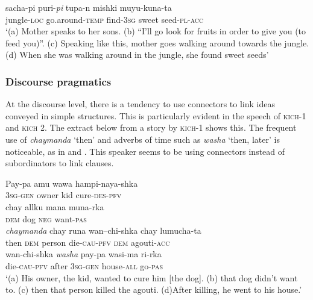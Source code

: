 \documentclass[output=paper]{langscibook}
\begin{document}
\ex\label{ex:7:10d}
\gll    sacha-pi           puri-\textit{pi} tupa-n             mishki      muyu-kuna-ta\\
jungle-\textsc{loc}  go.around-\textsc{temp}  find-\textsc{3sg}  sweet    seed-\textsc{pl}{}-\textsc{acc}\\
\glt ‘(a) Mother speaks to her sons. (b) “I’ll go look for fruits in order to give you (to feed you)”. (c) Speaking like this, mother goes walking around towards the jungle. (d) When she was walking around in the jungle, she found sweet seeds’
\z
\z

\subsubsection{Discourse pragmatics}
At the discourse level, there is a tendency to use connectors to link ideas conveyed in simple structures. This is particularly evident in the speech of {\textsc{kich}}{{}-1 and} {\textsc{kich}}{ 2. The extract below from a story by} {\textsc{kich}}{{}-1 shows this. The frequent use of} {\textit{chaymanda}}{ ‘then’ and adverbs of time such as} {\textit{washa}}{ ‘then, later’ is noticeable, as in  and . This speaker seems to be using connectors instead of subordinators to link clauses.}


\ea\label{ex:7:11}
\ea\label{ex:7:11a}
\gll   Pay-pa         amu   wawa   hampi-naya-shka\\
    \textsc{3sg-gen}  owner  kid  cure-\textsc{des-pfv}\\

\ex\label{ex:7:11b}
\gll   chay   allku   mana   muna-rka\\
          \textsc{dem}  dog  \textsc{neg}  want-\textsc{pas}\\

\ex\label{ex:7:11c}
\gll   \textit{chaymanda} chay   runa   wan–chi-shka  chay   lumucha-ta\\
       then    \textsc{dem}  person  die-\textsc{cau}{}-\textsc{pfv}  \textsc{dem}  agouti-\textsc{acc}\\

\ex\label{ex:7:11d}
\gll   wan-chi-shka \textit{washa} pay-pa           wasi-ma         ri-rka\\
    die-\textsc{cau}{}-\textsc{pfv} after \textsc{3sg-gen}  house-\textsc{all}  go-\textsc{pas}\\
\glt ‘(a) His owner, the kid, wanted to cure him [the dog]. (b) that dog didn’t want to. (c) then that person killed the agouti. (d)After killing, he went to his house.’
\z
\z
\end{document}
